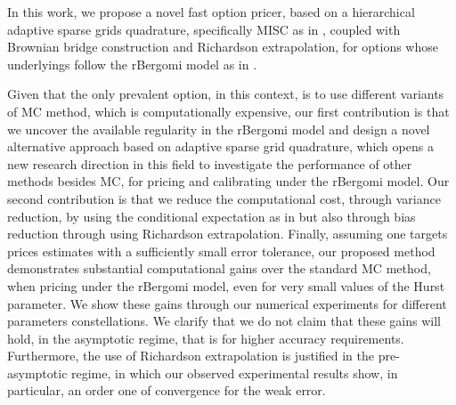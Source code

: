In this work,  we propose a novel fast option pricer,  based on a  hierarchical adaptive sparse grids quadrature, specifically  MISC as in  \cite{haji2016multi}, coupled with Brownian bridge construction and Richardson extrapolation, for options whose underlyings  follow the rBergomi model as in \cite{bayer2016pricing}. 



Given that the only prevalent option, in this context, is to use different variants of MC method, which is computationally expensive, our first contribution  is that we uncover the available regularity in the rBergomi model and  design a novel alternative approach based on  adaptive sparse grid quadrature, which opens a new research direction in this field to investigate the performance of other methods besides MC, for pricing and calibrating under the rBergomi model. Our second contribution is that we reduce the computational cost, through variance reduction,  by using the conditional expectation as in \cite{mccrickerd2017turbocharging} but also through bias reduction through using Richardson extrapolation. Finally, assuming one targets prices estimates with a sufficiently small error tolerance, our proposed method demonstrates substantial computational gains  over the standard MC method, when pricing under the rBergomi model, even for very small values of the Hurst parameter. We show  these gains through our numerical experiments for  different parameters constellations.  We clarify that we do not claim that these gains will hold, in the asymptotic regime, that is for higher accuracy requirements. Furthermore, the use of Richardson extrapolation is justified in the pre-asymptotic regime, in which our observed experimental results  show, in particular, an order one of convergence for the weak error.


